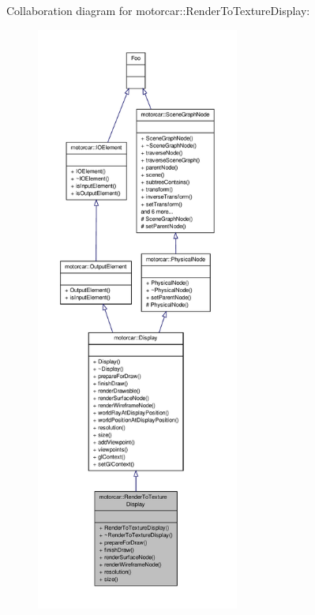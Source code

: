 Collaboration diagram for motorcar\-:\-:Render\-To\-Texture\-Display\-:
\nopagebreak
\begin{figure}[H]
\begin{center}
\leavevmode
\includegraphics[height=550pt]{classmotorcar_1_1RenderToTextureDisplay__coll__graph}
\end{center}
\end{figure}
